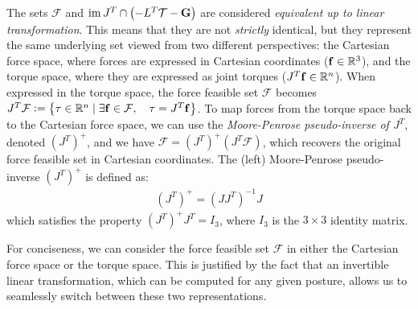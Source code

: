 The sets $\mathcal{F}$ and $\operatorname{im}{J^T} \cap \left(-L^T\mathcal{T}-\mathbf{G}\right)$ are considered \emph{equivalent up to linear transformation}. This means that they are not \emph{strictly} identical, but they represent the same underlying set viewed from two different perspectives: the Cartesian force space, where forces are expressed in Cartesian coordinates ($\mathbf{f}\in \mathbb{R}^3$), and the torque space, where they are expressed as joint torques ($J^T\mathbf{f}\in \mathbb{R}^n$). When expressed in the torque space, the force feasible set $\mathcal{F}$ becomes $J^T\mathcal{F} := \left\{\tau\in \mathbb{R}^n \mid \exists \mathbf{f}\in \mathcal{F}, \quad \tau = J^T\mathbf{f}\right\}$. 
To map forces from the torque space back to the Cartesian force space, we can use the \emph{Moore-Penrose pseudo-inverse of $J^T$}, denoted $(J^T)^+$, and we have $\mathcal{F} = (J^T)^+(J^T\mathcal{F})$, which recovers the original force feasible set in Cartesian coordinates. The (left) Moore-Penrose pseudo-inverse $(J^T)^+$ is defined as:
\begin{align*}
    (J^T)^+ = (JJ^T)^{-1}J
\end{align*}
which satisfies the property $(J^T)^+J^T = I_3$, where $I_3$ is the $3\times 3$ identity matrix.

For conciseness, we can consider the force feasible set $\mathcal{F}$ in either the Cartesian force space or the torque space. This is justified by the fact that an invertible linear transformation, which can be computed for any given posture, allows us to seamlessly switch between these two representations.

